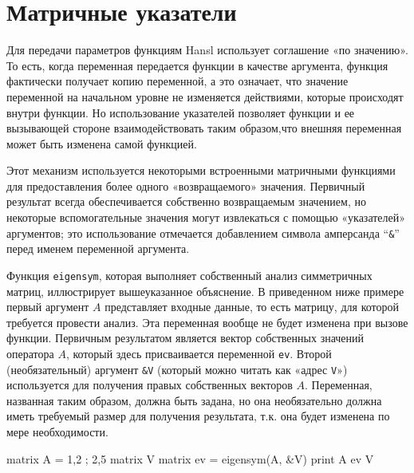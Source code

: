 \section{Матричные указатели}
\label{sec:mat-pointers}

Для передачи параметров функциям Hansl использует соглашение «по
значению». То есть, когда переменная передается функции в качестве
аргумента, функция фактически получает копию переменной, а это
означает, что значение переменной на начальном уровне не изменяется
действиями, которые происходят внутри функции. Но использование
указателей позволяет функции и ее вызывающей стороне взаимодействовать
таким образом,что внешняя переменная может быть изменена самой
функцией.

Этот механизм используется некоторыми встроенными матричными функциями
для предоставления более одного «возвращаемого» значения. Первичный
результат всегда обеспечивается собственно возвращаемым значением, но
некоторые вспомогательные значения могут извлекаться с помощью
«указателей» аргументов; это использование отмечается добавлением
символа амперсанда ``\texttt{\&}'' перед именем переменной аргумента.

Функция \texttt{eigensym}, которая выполняет собственный анализ
симметричных матриц, иллюстрирует вышеуказанное объяснение. В
приведенном ниже примере первый аргумент $A$ представляет входные
данные, то есть матрицу, для которой требуется провести анализ. Эта
переменная вообще не будет изменена при вызове функции. Первичным
результатом является вектор собственных значений оператора $A$,
который здесь присваивается переменной \texttt{ev}. Второй
(необязательный) аргумент \texttt{\&V} (который можно читать как
«адрес \texttt{V}») используется для получения правых собственных
векторов $A$. Переменная, названная таким образом, должна быть задана,
но она необязательно должна иметь требуемый размер для получения
результата, т.к. она будет изменена по мере необходимости.
\begin{code}
matrix A = {1,2 ; 2,5}
matrix V
matrix ev = eigensym(A, &V)
print A ev V
\end{code}

